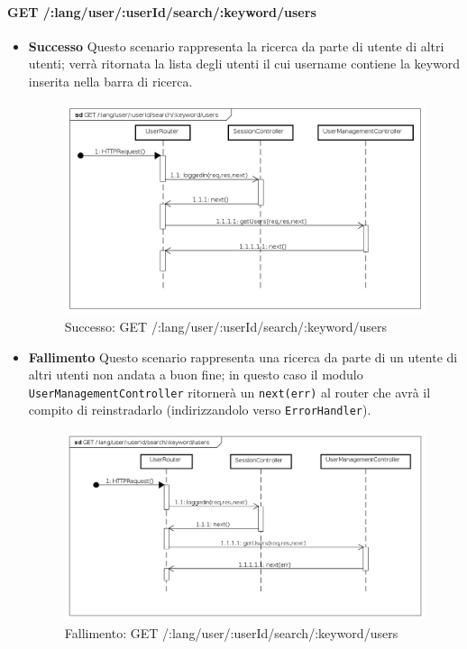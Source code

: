 \paragraph{GET /:lang/user/:userId/search/:keyword/users}
\begin{itemize}
\item \textbf{Successo}
Questo scenario rappresenta la ricerca da parte di utente di altri utenti; verrà ritornata la lista degli utenti il cui username contiene la keyword inserita nella barra di ricerca. 

\begin{figure}[ht]
	\centering
	\includegraphics[scale=0.45]{UML/DiagrammiDiSequenza/Back-end/GET__lang_user__userId_search__keyword_users_success.png}
	\caption{Successo: GET /:lang/user/:userId/search/:keyword/users}
\end{figure}
\FloatBarrier

\item \textbf{Fallimento}
Questo scenario rappresenta una ricerca da parte di un utente di altri utenti non andata a buon fine; in questo caso il modulo \texttt{UserManagementController} ritornerà un \texttt{next(err)} al router che avrà il compito di reinstradarlo (indirizzandolo verso \texttt{ErrorHandler}).

\begin{figure}[ht]
	\centering
	\includegraphics[scale=0.45]{UML/DiagrammiDiSequenza/Back-end/GET__lang_user__userId_search__keyword_users_failure.png}
	\caption{Fallimento: GET /:lang/user/:userId/search/:keyword/users}
\end{figure}
\FloatBarrier

\end{itemize}






